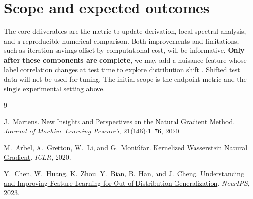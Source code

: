 \documentclass[11pt]{article}
\begin{document}
\section*{Scope and expected outcomes}

The core deliverables are the metric-to-update derivation, local spectral
analysis, and a reproducible numerical comparison. Both improvements and
limitations, such as iteration savings offset by computational cost, will
be informative.
\textbf{Only after these components are complete}, we may add a nuisance
feature whose label correlation changes at test time to explore distribution
shift \cite{chen2023}. Shifted test data will not be used for tuning.
The initial scope is the endpoint metric and the single experimental setting
above.

\renewcommand{\refname}{References}
\begin{thebibliography}{9}
\setlength{\itemsep}{0.25em}

J.~Martens.
\newblock \href{https://www.jmlr.org/papers/volume21/17-678/17-678.pdf}
{New Insights and Perspectives on the Natural Gradient Method}.
\newblock \emph{Journal of Machine Learning Research}, 21(146):1--76, 2020.

M.~Arbel, A.~Gretton, W.~Li, and G.~Mont\'ufar.
\newblock \href{https://openreview.net/pdf?id=Hklz71rYvS}
{Kernelized Wasserstein Natural Gradient}.
\newblock \emph{ICLR}, 2020.

Y.~Chen, W.~Huang, K.~Zhou, Y.~Bian, B.~Han, and J.~Cheng.
\newblock \href{https://papers.neurips.cc/paper_files/paper/2023/hash/d73d5645ddbb9ada6c862116435574f6-Abstract-Conference.html}
{Understanding and Improving Feature Learning for Out-of-Distribution
Generalization}.
\newblock \emph{NeurIPS}, 2023.

\end{thebibliography}
\end{document}
